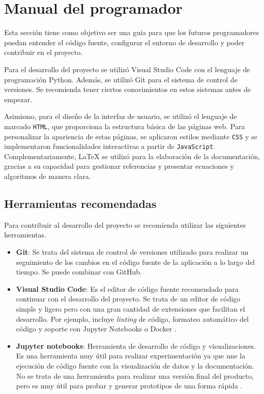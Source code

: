 \section{Manual del programador}

Esta sección tiene como objetivo ser una guía para que los futuros programadores puedan entender el código fuente, configurar el entorno de desarrollo y poder contribuir en el proyecto.

Para el desarrollo del proyecto se utilizó Visual Studio Code con el lenguaje de programación Python. Además, se utilizó Git para el sistema de control de versiones. Se recomienda tener ciertos conocimientos en estos sistemas antes de empezar.

Asimismo, para el diseño de la interfaz de usuario, se utilizó el lenguaje de marcado \texttt{HTML}, que proporciona la estructura básica de las páginas web. Para personalizar la apariencia de estas páginas, se aplicaron estilos mediante \texttt{CSS} y se implementaron funcionalidades interactivas a partir de \texttt{JavaScript}. Complementariamente, LaTeX se utilizó para la elaboración de la documentación, gracias a su capacidad para gestionar referencias y presentar ecuaciones y algoritmos de manera clara.

\subsection{Herramientas recomendadas}

Para contribuir al desarrollo del proyecto se recomienda utilizar las siguientes herramientas.

\begin{itemize}
\tightlist

\item \textbf{Git}: Se trata del sistema de control de versiones utilizado para realizar un seguimiento de los cambios en el código fuente de la aplicación a lo largo del tiempo. Se puede combinar con GitHub. \cite{Git, GitHub}


\item \textbf{Visual Studio Code}: Es el editor de código fuente recomendado para continuar con el desarrollo del proyecto. Se trata de un editor de código simple y ligero pero con una gran cantidad de extensiones que facilitan el desarrollo.
Por ejemplo, incluye \emph{linting} de código, formateo automático del código y soporte con Jupyter Notebooks o Docker \cite{Microsoft_2021}.


\item \textbf{Jupyter notebooks}: Herramienta de desarrollo de código y visualizaciones. Es una herramienta muy útil para realizar experimentación ya que une la ejecución de código fuente con la visualización de datos y la documentación.
No se trata de una herramienta para realizar una versión final del producto, pero es muy útil para probar y generar prototipos de una forma rápida \cite{Jupyter}.


\end{itemize}

